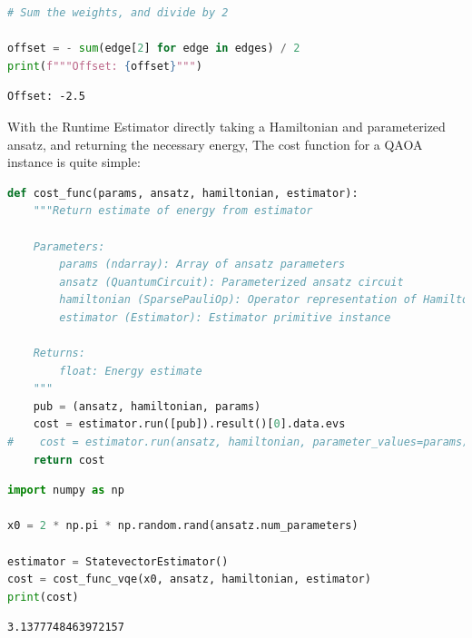 \documentclass[12pt, oneside]{book}
\theoremstyle{definition}
\theoremstyle{definition}
\theoremstyle{remark}
\begin{document}
\begin{lstlisting}[language=Python]
# Sum the weights, and divide by 2

offset = - sum(edge[2] for edge in edges) / 2
print(f"""Offset: {offset}""")
\end{lstlisting}
\begin{lstlisting}
Offset: -2.5
\end{lstlisting}
With the Runtime Estimator directly taking a Hamiltonian and parameterized ansatz, and returning the necessary energy, The cost function for a QAOA instance is quite simple:
\begin{lstlisting}[language=Python]
def cost_func(params, ansatz, hamiltonian, estimator):
    """Return estimate of energy from estimator

    Parameters:
        params (ndarray): Array of ansatz parameters
        ansatz (QuantumCircuit): Parameterized ansatz circuit
        hamiltonian (SparsePauliOp): Operator representation of Hamiltonian
        estimator (Estimator): Estimator primitive instance

    Returns:
        float: Energy estimate
    """
    pub = (ansatz, hamiltonian, params)
    cost = estimator.run([pub]).result()[0].data.evs
#    cost = estimator.run(ansatz, hamiltonian, parameter_values=params).result().values[0]
    return cost
\end{lstlisting}
\begin{lstlisting}[language=Python]
import numpy as np

x0 = 2 * np.pi * np.random.rand(ansatz.num_parameters)

estimator = StatevectorEstimator()
cost = cost_func_vqe(x0, ansatz, hamiltonian, estimator)
print(cost)    
\end{lstlisting}
\begin{lstlisting}
3.1377748463972157
\end{lstlisting}
\end{document}
